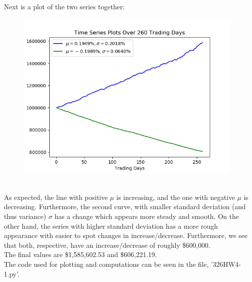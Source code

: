 \documentclass[12pt]{article}
\begin{document}
\newpage
Next is a plot of the two series together:
\begin{figure}[h]
	\centering
	\includegraphics[scale=.75]{13plot.png}
\end{figure}
\\As expected, the line with positive $\mu$ is increasing, and the one with negative $\mu$ is decreasing. Furthermore, the second curve, with smaller standard deviation (and thus variance) $\sigma$ has a change which appears more steady and smooth. On the other hand, the series with higher standard deviation has a more rough appearance with easier to spot changes in increase/decrease. Furthermore, we see that both, respective, have an increase/decrease of roughly \$600,000.
\\The final values are \$1,585,602.53 and \$606,221.19.
\\The code used for plotting and computations can be seen in the file, '326HW4-1.py'.

\newpage
\end{document}
